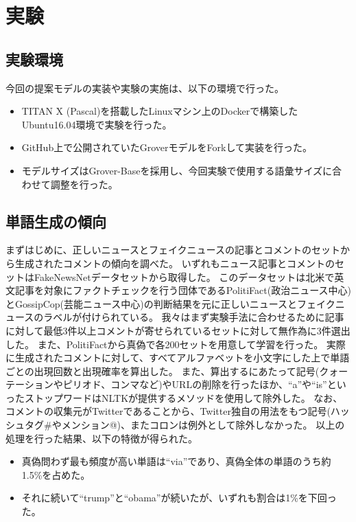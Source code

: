 \section{実験}
\subsection{実験環境}
今回の提案モデルの実装や実験の実施は、以下の環境で行った。
\begin{itemize}
    \item TITAN X (Pascal)を搭載したLinuxマシン上のDockerで構築したUbuntu16.04環境で実験を行った。
    \item GitHub上で公開されていたGroverモデルをForkして実装を行った。
    \item モデルサイズはGrover-Baseを採用し、今回実験で使用する語彙サイズに合わせて調整を行った。
\end{itemize}

\subsection{単語生成の傾向}
\label{subsec:trend}
まずはじめに、正しいニュースとフェイクニュースの記事とコメントのセットから生成されたコメントの傾向を調べた。
いずれもニュース記事とコメントのセットはFakeNewsNetデータセット\cite{Shu2018FakeNewsNetAD}から取得した。
このデータセットは北米で英文記事を対象にファクトチェックを行う団体であるPolitiFact(政治ニュース中心)とGossipCop(芸能ニュース中心)の判断結果を元に正しいニュースとフェイクニュースのラベルが付けられている。
我々はまず実験手法に合わせるために記事に対して最低3件以上コメントが寄せられているセットに対して無作為に3件選出した。
また、PolitiFactから真偽で各200セットを用意して学習を行った。
実際に生成されたコメントに対して、すべてアルファベットを小文字にした上で単語ごとの出現回数と出現確率を算出した。
また、算出するにあたって記号(クォーテーションやピリオド、コンマなど)やURLの削除を行ったほか、``a''や``is''といったストップワードはNLTK\cite{bird-loper-2004-nltk}が提供するメソッドを使用して除外した。
なお、コメントの収集元がTwitterであることから、Twitter独自の用法をもつ記号(ハッシュタグ\#やメンション@)、またコロンは例外として除外しなかった。
以上の処理を行った結果、以下の特徴が得られた。

\begin{itemize}
    \item 真偽問わず最も頻度が高い単語は``via''であり、真偽全体の単語のうち約1.5\%を占めた。
    \item それに続いて``trump''と``obama''が続いたが、いずれも割合は1\%を下回った。
\end{itemize}

